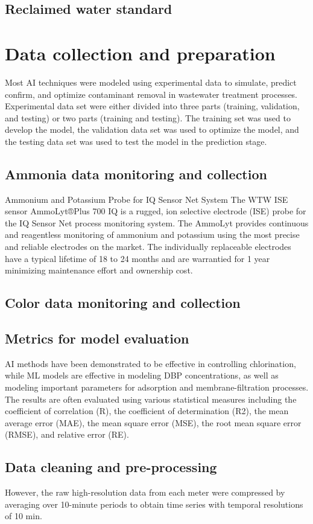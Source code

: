 \subsection{Reclaimed water standard }
\section{Data collection and preparation}
Most AI techniques were modeled using experimental data to simulate, predict confirm, and optimize contaminant removal in wastewater treatment processes. Experimental data set were either divided into three parts (training, validation, and testing) or two parts (training and testing). The training set was used to develop the model, the validation data set was used to optimize the model, and the testing data set was used to test the model in the prediction stage.
\subsection{Ammonia data monitoring and collection}
Ammonium and Potassium Probe for IQ Sensor Net System
The WTW ISE sensor AmmoLyt®Plus 700 IQ is a rugged, ion selective electrode (ISE) probe for the IQ Sensor Net process monitoring system. The AmmoLyt provides continuous and reagentless monitoring of ammonium and potassium using the most precise and reliable electrodes on the market. The individually replaceable electrodes have a typical lifetime of 18 to 24 months and are warrantied for 1 year minimizing maintenance effort and ownership cost.  
\subsection{Color data monitoring and collection}

\subsection{Metrics for model evaluation}

AI methods have been demonstrated to be effective in controlling chlorination, while ML models are effective in modeling DBP concentrations, as well as modeling important parameters for adsorption and membrane-filtration processes. The results are often evaluated using various statistical measures including the coefficient of correlation (R), the coefficient of determination (R2), the mean average error (MAE), the mean square error (MSE), the root mean square error (RMSE), and relative error (RE).
\subsection{Data cleaning and pre-processing}
However, the raw high-resolution data from each meter were compressed by averaging over 10-minute periods to obtain time series with temporal resolutions of 10 min.

